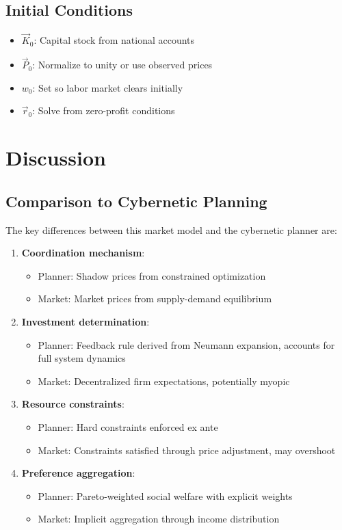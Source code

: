 \documentclass[12pt,a4paper]{article}
\theoremstyle{definition}
\theoremstyle{remark}
\begin{document}
\subsection{Initial Conditions}

\begin{itemize}
    \item $\vec{K}_0$: Capital stock from national accounts
    \item $\vec{P}_0$: Normalize to unity or use observed prices
    \item $w_0$: Set so labor market clears initially
    \item $\vec{r}_0$: Solve from zero-profit conditions
\end{itemize}

\section{Discussion}

\subsection{Comparison to Cybernetic Planning}

The key differences between this market model and the cybernetic planner are:

\begin{enumerate}
    \item \textbf{Coordination mechanism}:
    \begin{itemize}
        \item Planner: Shadow prices from constrained optimization
        \item Market: Market prices from supply-demand equilibrium
    \end{itemize}
    
    \item \textbf{Investment determination}:
    \begin{itemize}
        \item Planner: Feedback rule derived from Neumann expansion, accounts for full system dynamics
        \item Market: Decentralized firm expectations, potentially myopic
    \end{itemize}
    
    \item \textbf{Resource constraints}:
    \begin{itemize}
        \item Planner: Hard constraints enforced ex ante
        \item Market: Constraints satisfied through price adjustment, may overshoot
    \end{itemize}
    
    \item \textbf{Preference aggregation}:
    \begin{itemize}
        \item Planner: Pareto-weighted social welfare with explicit weights
        \item Market: Implicit aggregation through income distribution
    \end{itemize}
\end{enumerate}
\end{document}
